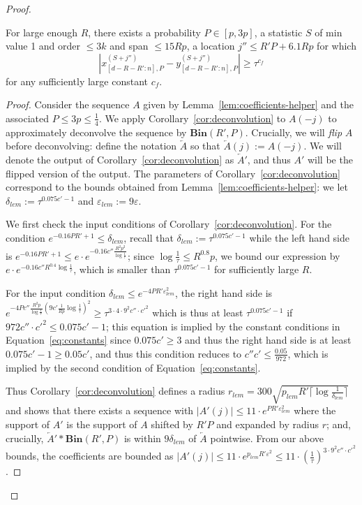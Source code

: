\documentclass[10pt,a4paper]{amsart}
\newcommand{\Bin}[2]{\textbf{Bin}(#1,#2)}
\newcommand{\eps}{\varepsilon}
\begin{document}
\begin{proof}
\begin{lemma}\label{lem:statistics-deconvolution}
    For large enough $R$, there exists a probability $P \in [p,3p]$, a statistic $S$ of min value 1 and order $\leq 3k$ and span $\leq 15Rp$, a location $j'' \leq R'P + 6.1Rp$ for which
    \begin{equation}\label{eq:final-discrepancy}|x_{[d-R-R':n],P}^{(S+j'')}-y_{[d-R-R':n],P}^{(S+j'')}|\geq \tau^{c_f}\end{equation}
    for any sufficiently large constant $c_f$. 
\end{lemma}
\begin{proof}
    Consider the sequence $A$ given by Lemma~\ref{lem:coefficients-helper} and the associated $P\leq 3p\leq\frac{1}{4}$. We apply Corollary~\ref{cor:deconvolution} to $A(-j)$ to approximately deconvolve the sequence by $\Bin{R'}{P}$. Crucially, we will \emph{flip} $A$ before deconvolving: define the notation $\overleftarrow{A}$ so that $\overleftarrow{A}(j):=A(-j)$. We will denote the output of Corollary~\ref{cor:deconvolution} as $\overleftarrow{A}'$, and thus $A'$ will be the flipped version of the output. The parameters of Corollary~\ref{cor:deconvolution} correspond to the bounds obtained from Lemma~\ref{lem:coefficients-helper}: we let $\delta_{lem}:=\tau^{0.075c'-1}$ and $\eps_{lem}:=9\eps$. 

    We first check the input conditions of Corollary~\ref{cor:deconvolution}. For the condition $e^{-0.16PR'+1}\leq\delta_{lem}$, recall that $\delta_{lem}:=\tau^{0.075c'-1}$ while the left hand side is $e^{-0.16PR'+1}\leq e\cdot e^{-0.16 c''\frac{R^2 p^2}{\log\frac{1}{\tau}}}$; since $\log\frac{1}{\tau}\leq R^{0.8}p$, we bound our expression by $e\cdot e^{-0.16 c''R^{0.4}\log\frac{1}{\tau}}$, which is smaller than $\tau^{0.075c'-1}$ for sufficiently large $R$.

    For the input condition $\delta_{lem}\leq e^{-4PR'\eps_{lem}^2}$, the right hand side is $e^{-4Pc''\frac{R^2 p}{\log\frac{1}{\tau}}(9c' \frac{1}{Rp}\log\frac{1}{\tau})^2}\geq\tau^{3\cdot 4\cdot 9^2c''\cdot {c'}^2}$ which is thus at least $\tau^{0.075c'-1}$ if $972c''\cdot {c'}^2\leq 0.075c'-1$; this equation is implied by the constant conditions in Equation~\ref{eq:constants} since $0.075c'\geq 3$ and thus the right hand side is at least $0.075c'-1\geq 0.05c'$, and thus this condition reduces to $c''c'\leq \frac{0.05}{972}$, which is implied by the second condition of Equation~\ref{eq:constants}.
    
    Thus Corollary~\ref{cor:deconvolution} defines a radius $r_{lem}=300\sqrt{p_{lem}R'\lceil\log\frac{1}{\delta_{lem}}\rceil}$ and shows that there exists a sequence with $|A'(j)|\leq 11\cdot e^{PR'\eps_{lem}^2}$ where the support of $A'$ is the support of $A$ shifted by $R'P$ and expanded by radius $r$; and, crucially, $\overleftarrow{A}'\ast \Bin{R'}{P}$ is within $9\delta_{lem}$ of $\overleftarrow{A}$ pointwise. From our above bounds, the coefficients are bounded as $|A'(j)|\leq 11\cdot e^{p_{lem}R'\eps^2}\leq 11\cdot (\frac{1}{\tau})^{3\cdot 9^2c''\cdot {c'}^2}$. 


\end{proof}
\end{proof}
\end{document}
